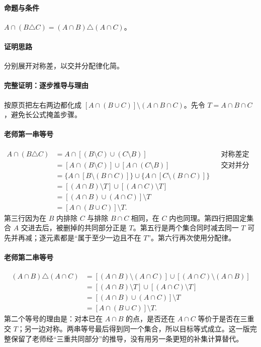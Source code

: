 \paragraph{命题与条件}$A\cap(B\triangle C)=(A\cap B)\triangle(A\cap C)$。
\paragraph{证明思路}分别展开对称差，以交并分配律化简。
\paragraph{完整证明：逐步推导与理由}

按原页把左右两边都化成 $[A\cap(B\cup C)]\setminus(A\cap B\cap C)$。先令 $T=A\cap B\cap C$，避免长公式掩盖步骤。
\paragraph{老师第一串等号}
\begin{align*}
A\cap(B\triangle C)
&=A\cap[(B\setminus C)\cup(C\setminus B)]&&\text{对称差定义}\\
&=[A\cap(B\setminus C)]\cup[A\cap(C\setminus B)]&&\text{交对并分配}\\
&=\{A\cap[B\setminus(B\cap C)]\}\cup\{A\cap[C\setminus(B\cap C)]\}\\
&=[(A\cap B)\setminus T]\cup[(A\cap C)\setminus T]\\
&=[(A\cap B)\cup(A\cap C)]\setminus T\\
&=[A\cap(B\cup C)]\setminus T.
\end{align*}
第三行因为在 $B$ 内排除 $C$ 与排除 $B\cap C$ 相同，在 $C$ 内也同理。第四行把固定集合 $A$ 交进去后，被删掉的共同部分正是 $T$。第五行是两个集合同时减去同一 $T$ 可先并再减；逐元素都是“属于至少一边且不在 $T$”。第六行再次使用分配律。
\paragraph{老师第二串等号}
\begin{align*}
(A\cap B)\triangle(A\cap C)
&=[(A\cap B)\setminus(A\cap C)]\cup[(A\cap C)\setminus(A\cap B)]\\
&=[(A\cap B)\setminus T]\cup[(A\cap C)\setminus T]\\
&=[(A\cap B)\cup(A\cap C)]\setminus T\\
&=[A\cap(B\cup C)]\setminus T.
\end{align*}
第二个等号的理由是：对本已在 $A\cap B$ 的点，是否还在 $A\cap C$ 等价于是否在三重交 $T$；另一边对称。两串等号最后得到同一个集合，所以目标等式成立。这一版完整保留了老师经“三重共同部分”的推导，没有用另一条更短的补集计算替代。

